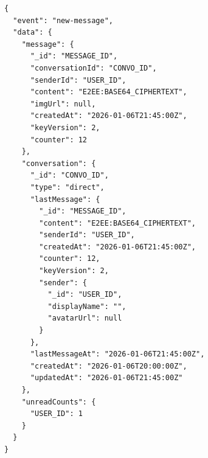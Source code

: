 \begin{verbatim}
{
  "event": "new-message",
  "data": {
    "message": {
      "_id": "MESSAGE_ID",
      "conversationId": "CONVO_ID",
      "senderId": "USER_ID",
      "content": "E2EE:BASE64_CIPHERTEXT",
      "imgUrl": null,
      "createdAt": "2026-01-06T21:45:00Z",
      "keyVersion": 2,
      "counter": 12
    },
    "conversation": {
      "_id": "CONVO_ID",
      "type": "direct",
      "lastMessage": {
        "_id": "MESSAGE_ID",
        "content": "E2EE:BASE64_CIPHERTEXT",
        "senderId": "USER_ID",
        "createdAt": "2026-01-06T21:45:00Z",
        "counter": 12,
        "keyVersion": 2,
        "sender": {
          "_id": "USER_ID",
          "displayName": "",
          "avatarUrl": null
        }
      },
      "lastMessageAt": "2026-01-06T21:45:00Z",
      "createdAt": "2026-01-06T20:00:00Z",
      "updatedAt": "2026-01-06T21:45:00Z"
    },
    "unreadCounts": {
      "USER_ID": 1
    }
  }
}
\end{verbatim}